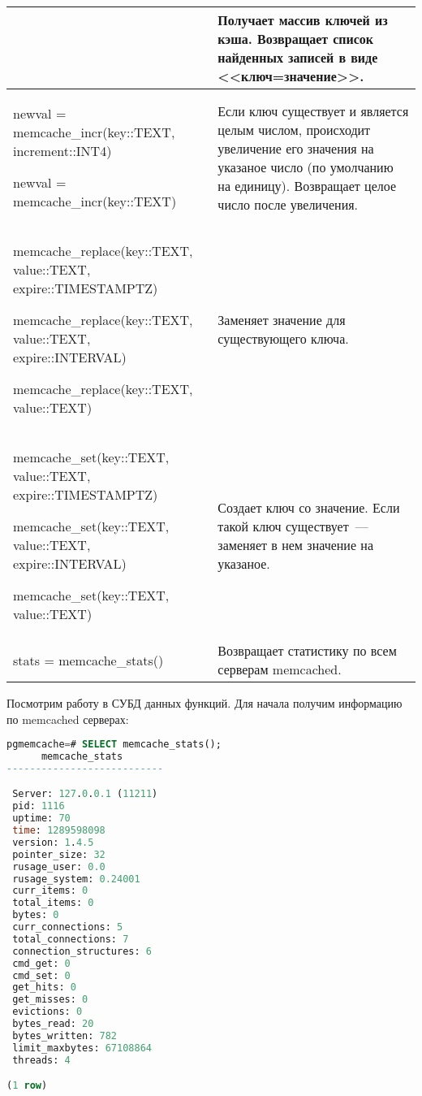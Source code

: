 \begin{table}[h]
\begin{tabular}{| >{\raggedright\scriptsize}p{7cm}| >{\scriptsize}p{7cm} |}
&
Получает массив ключей из кэша.
Возвращает список найденных записей в виде <<ключ=значение>>.\\

\hline

newval = memcache\_incr(key::TEXT, increment::INT4)

newval = memcache\_incr(key::TEXT)

&
Если ключ существует и является целым числом, происходит увеличение
его значения на указаное число (по умолчанию на единицу).
Возвращает целое число после увеличения.\\

\hline

memcache\_replace(key::TEXT, value::TEXT, expire::TIMESTAMPTZ)

memcache\_replace(key::TEXT, value::TEXT, expire::INTERVAL)

memcache\_replace(key::TEXT, value::TEXT)

&
Заменяет значение для существующего ключа.\\

\hline

memcache\_set(key::TEXT, value::TEXT, expire::TIMESTAMPTZ)

memcache\_set(key::TEXT, value::TEXT, expire::INTERVAL)

memcache\_set(key::TEXT, value::TEXT)

&
Создает ключ со значение. Если такой ключ существует~--- заменяет в нем значение на указаное.\\

\hline

stats = memcache\_stats()

&
Возвращает статистику по всем серверам memcached.\\

\hline
\end{tabular}
\end{table}

Посмотрим работу в СУБД данных функций. Для начала получим информацию по memcached серверах:

\begin{lstlisting}[language=SQL,label=lst:pgcache8,caption=Проверка memcache\_stats]
pgmemcache=# SELECT memcache_stats();
      memcache_stats
---------------------------

 Server: 127.0.0.1 (11211)
 pid: 1116
 uptime: 70
 time: 1289598098
 version: 1.4.5
 pointer_size: 32
 rusage_user: 0.0
 rusage_system: 0.24001
 curr_items: 0
 total_items: 0
 bytes: 0
 curr_connections: 5
 total_connections: 7
 connection_structures: 6
 cmd_get: 0
 cmd_set: 0
 get_hits: 0
 get_misses: 0
 evictions: 0
 bytes_read: 20
 bytes_written: 782
 limit_maxbytes: 67108864
 threads: 4

(1 row)
\end{lstlisting}

